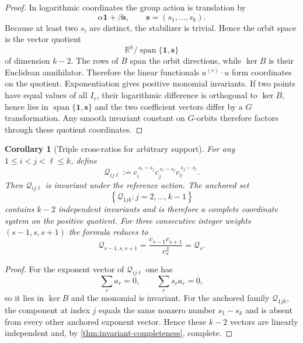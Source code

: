 \documentclass[aps,prd,preprint,onecolumn,nofootinbib,superscriptaddress,showkeys]{revtex4-2}
\numberwithin{equation}{section}
\theoremstyle{definition}
\theoremstyle{plain}
\newtheorem{corollary}{Corollary}[section]
\begin{document}
\begin{proof}
In logarithmic coordinates the group action is translation by
\[
\alpha\mathbf 1+\beta\mathbf s,
\qquad
\mathbf s=(s_1,\ldots,s_k).
\]
Because at least two $s_i$ are distinct, the stabilizer is trivial.  Hence the orbit space is the vector quotient
\[
\mathbb R^k/\operatorname{span}\{\mathbf 1,\mathbf s\}
\]
of dimension $k-2$.  The rows of $B$ span the orbit directions, while $\ker B$ is their Euclidean annihilator.  Therefore the linear functionals $a^{(r)}\cdot u$ form coordinates on the quotient.  Exponentiation gives positive monomial invariants.  If two points have equal values of all $I_r$, their logarithmic difference is orthogonal to $\ker B$, hence lies in $\operatorname{span}\{\mathbf 1,\mathbf s\}$ and the two coefficient vectors differ by a $G$ transformation.  Any smooth invariant constant on $G$-orbits therefore factors through these quotient coordinates.
\end{proof}

\begin{corollary}[Triple cross-ratios for arbitrary support]\label{cor:triple-crossratio}
For any $1\le i<j<\ell\le k$, define
\begin{equation}
\boxed{
\mathcal Q_{ij\ell}
:=
c_i^{\,s_\ell-s_j}
 c_j^{\,s_i-s_\ell}
 c_\ell^{\,s_j-s_i}.
}
\end{equation}
Then $\mathcal Q_{ij\ell}$ is invariant under the reference action.  The anchored set
\begin{equation}
\left\{\mathcal Q_{1j k}:j=2,\ldots,k-1\right\}
\end{equation}
contains $k-2$ independent invariants and is therefore a complete coordinate system on the positive quotient.  For three consecutive integer weights $(s-1,s,s+1)$ the formula reduces to
\[
\mathcal Q_{s-1,s,s+1}=\frac{c_{s-1}c_{s+1}}{c_s^2}=\mathcal Q_s.
\]
\end{corollary}

\begin{proof}
For the exponent vector of $\mathcal Q_{ij\ell}$ one has
\[
\sum_r a_r=0,
\qquad
\sum_r s_ra_r=0,
\]
so it lies in $\ker B$ and the monomial is invariant.  For the anchored family $\mathcal Q_{1jk}$, the component at index $j$ equals the same nonzero number $s_1-s_k$ and is absent from every other anchored exponent vector.  Hence these $k-2$ vectors are linearly independent and, by \cref{thm:invariant-completeness}, complete.
\end{proof}
\end{document}

